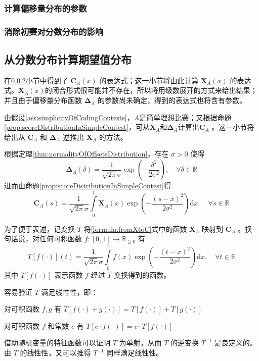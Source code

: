         \subsubsection{计算偏移量分布的参数}\label{sec:parameterOfDeltaDistribution}

        \subsubsection{消除初赛对分数分布的影响}\label{sec:counteringPreliminaryRound}


    \subsection{从分数分布计算期望值分布}\label{sec:calculatingXofSecondRound}


        在\ref{sec:counteringPreliminaryRound}小节中得到了 $\bm{C}_A(x)$ 的表达式；这一小节将由此计算 $\bm{X}_A(x)$ 的表达式。$\bm{X}_A(x)$的闭合形式很可能并不存在，所以将用级数展开的方式来给出结果；并且由于偏移量分布函数 $\bm{\Delta}_A$ 的参数尚未确定，得到的表达式也将含有参数。

        由假设\ref{ass:simplicityOfCodingContests}，$A$是简单理想比赛；又根据命题\ref{prop:scoreDistributionInSimpleContest}，可从$\bm{X}_A$和$\bm{\Delta}_A$计算出$\bm{C}_A$ 。这一小节将给出从 $\bm{C}_A$ 和 $\bm{\Delta}_A$ 逆推出 $\bm{X}_A$ 的方法。

        根据定理\ref{thm:normalityOfOffsetsDistribution}，存在 $\sigma>0$ 使得
        $$
        \bm{\Delta}_A(\delta)=\frac{1}{\sqrt{2\pi}\sigma}\exp{\left(-\frac{\delta^2}{2\sigma^2}\right)},\quad\forall \delta\in\mathbb{R}
        $$
        进而由命题\ref{prop:scoreDistributionInSimpleContest}得
        \begin{equation}
            \bm{C}_A(s)=\frac{1}{\sqrt{2\pi}\sigma}\int\limits_0^1 \bm{X}_A(x)\exp{\left(-\frac{(s-x)^2}{2\sigma^2}\right)}\mathrm{d}x,\quad\forall s\in\mathbb{R}
            \label{formula:fromXtoC}
        \end{equation}

        为了便于表述，记变换 $T$ 将\eqref{formula:fromXtoC}式中的函数 $\bm{X}_A$ 映射到 $\bm{C}_A$ 。换句话说，对任何可积函数 $f:[0,1]\to\mathbb{R}_{\geq 0}$ 有
        $$
        T\left[f(\cdot)\right](t)=\frac{1}{\sqrt{2\pi}\sigma}\int\limits_0^1 f(x)\exp{\left(-\frac{(t-x)^2}{2\sigma^2}\right)}\mathrm{d}x,\quad\forall t\in\mathbb{R}
        $$
        其中 $T\left[f(\cdot)\right]$ 表示函数 $f$ 经过 $T$ 变换得到的函数。

        容易验证 $T$ 满足线性性，即：
        \begin{asparaenum}
            \item 对可积函数 $f,g$ 有 $T\left[f(\cdot)+g(\cdot)\right]=T\left[f(\cdot)\right]+T\left[g(\cdot)\right]$
            \item 对可积函数 $f$ 和常数 $c$ 有 $T\left[c\cdot f(\cdot)\right]=c\cdot T\left[f(\cdot)\right]$
        \end{asparaenum}

        借助随机变量的特征函数可以证明 $T$ 为单射，从而 $T$ 的逆变换 $T^{-1}$ 是良定义的。由 $T$ 的线性性，又可以推得 $T^{-1}$ 同样满足线性性。